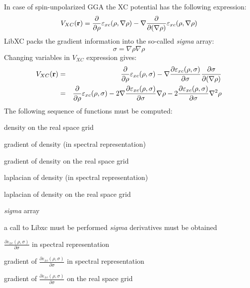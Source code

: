 In case of spin-\/unpolarized G\+G\+A the X\+C potential has the following expression\+: \[ V_{XC}({\bf r}) = \frac{\partial}{\partial \rho} \varepsilon_{xc}(\rho, \nabla \rho) - \nabla \frac{\partial}{\partial (\nabla \rho)} \varepsilon_{xc}(\rho, \nabla \rho) \] Lib\+X\+C packs the gradient information into the so-\/called {\itshape sigma} array\+: \[ \sigma = \nabla \rho \nabla \rho \] Changing variables in $ V_{XC} $ expression gives\+: \begin{eqnarray*} V_{XC}({\bf r}) &=& \frac{\partial}{\partial \rho} \varepsilon_{xc}(\rho, \sigma) - \nabla \frac{\partial \varepsilon_{xc}(\rho, \sigma)}{\partial \sigma} \frac{\partial \sigma}{ \partial (\nabla \rho)} \\ &=& \frac{\partial}{\partial \rho} \varepsilon_{xc}(\rho, \sigma) - 2 \nabla \frac{\partial \varepsilon_{xc}(\rho, \sigma)}{\partial \sigma} \nabla \rho - 2 \frac{\partial \varepsilon_{xc}(\rho, \sigma)}{\partial \sigma} \nabla^2 \rho \end{eqnarray*} The following sequence of functions must be computed\+:
\begin{DoxyItemize}
\item density on the real space grid
\item gradient of density (in spectral representation)
\item gradient of density on the real space grid
\item laplacian of density (in spectral representation)
\item laplacian of density on the real space grid
\item {\itshape sigma} array
\item a call to Libxc must be performed {\itshape sigma} derivatives must be obtained
\item $ \frac{\partial \varepsilon_{xc}(\rho, \sigma)}{\partial \sigma} $ in spectral representation
\item gradient of $ \frac{\partial \varepsilon_{xc}(\rho, \sigma)}{\partial \sigma} $ in spectral representation
\item gradient of $ \frac{\partial \varepsilon_{xc}(\rho, \sigma)}{\partial \sigma} $ on the real space grid
\end{DoxyItemize}


